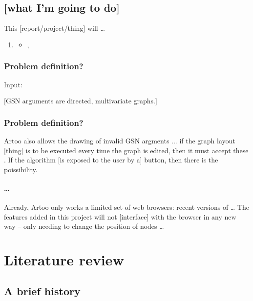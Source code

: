 \documentclass[authoryearcitations]{UoYCSproject}
\begin{document}

\section{[what I'm going to do]}

This [report/project/thing] will \ldots

    \begin{enumerate}
        \item \begin{itemize}
            \item ,
        \end{itemize}
    \end{enumerate}

\subsection{Problem definition?}

Input:

[GSN arguments are directed, multivariate  graphs.]



\subsection{Problem definition?}

Artoo also allows the drawing of invalid GSN argments ...
if the graph layout [thing] is to be executed every time the graph is edited, then it must accept these .
If the algorithm [is exposed to the user by a] button, then there is the poissibility.

\subsubsection{\ldots}

Already, Artoo only works a limited set of web browsers: recent versions of \ldots
The features added in this project will not [interface] with the browser in any new way -- only needing to change the position of nodes \ldots



\chapter{Literature review}

\section{A brief history}
\end{document}
